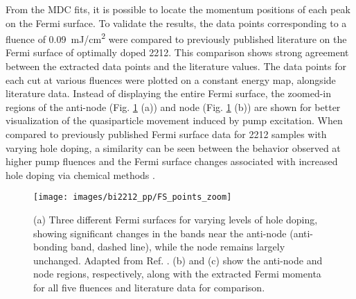 From the MDC fits, it is possible to locate the momentum positions of each peak on the Fermi surface.
To validate the results, the data points corresponding to a fluence of \qty{0.09}{\milli\joule/\centi\meter\squared} were compared to previously published literature on the Fermi surface of optimally doped 2212.
This comparison shows strong agreement between the extracted data points and the literature values.
The data points for each cut at various fluences were plotted on a constant energy map, alongside literature data.
Instead of displaying the entire Fermi surface, the zoomed-in regions of the anti-node (Fig. \ref{fig:FS_points_zoom} (a)) and node (Fig. \ref{fig:FS_points_zoom} (b)) are shown for better visualization of the quasiparticle movement induced by pump excitation.
When compared to previously published Fermi surface data for 2212 samples with varying hole doping, a similarity can be seen between the behavior observed at higher pump fluences and the Fermi surface changes associated with increased hole doping via chemical methods \cite{drozdov_phase_2018}.

\begin{figure}[t]
	\centering
	\texttt{[image: images/bi2212\_pp/FS\_points\_zoom]}
	\caption{(a) Three different Fermi surfaces for varying levels of hole doping, showing significant changes in the bands near the anti-node (anti-bonding band, dashed line), while the node remains largely unchanged. Adapted from Ref. \cite{drozdov_phase_2018}. (b) and (c) show the anti-node and node regions, respectively, along with the extracted Fermi momenta for all five fluences and literature data for comparison.}
	\label{fig:FS_points_zoom}
\end{figure}


